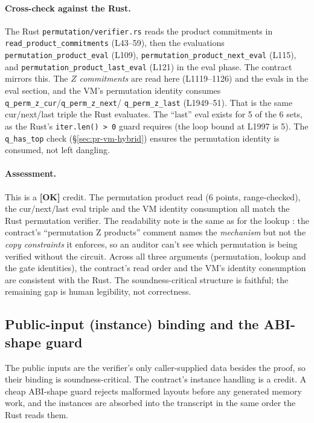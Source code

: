 \paragraph{Cross-check against the Rust.}
The Rust \texttt{permutation/\allowbreak{}verifier.rs} reads the product
commitments in \texttt{read\_\allowbreak{}product\_\allowbreak{}commitments} (L43--59),
then the evaluations \texttt{permutation\_\allowbreak{}product\_\allowbreak{}eval} (L109),
\texttt{permutation\_\allowbreak{}product\_\allowbreak{}next\_\allowbreak{}eval} (L115), and
\texttt{permutation\_\allowbreak{}product\_\allowbreak{}last\_\allowbreak{}eval} (L121) in the eval
phase. The contract mirrors this. The $Z$ \emph{commitments} are
read here (L1119--1126) and the evals in the eval section, and
the VM's permutation identity consumes
\texttt{q\_perm\_z\_cur}/\texttt{q\_perm\_z\_next}/
\texttt{q\_perm\_z\_last} (L1949--51). That is the same
cur/next/last triple the Rust evaluates. The ``last'' eval exists
for 5 of the 6 sets, as the Rust's \texttt{iter.len() > 0} guard
requires (the loop bound at L1997 is 5). The
\texttt{q\_has\_top} check (\S\ref{sec:pr-vm-hybrid}) ensures
the permutation identity is consumed, not left dangling.

\paragraph{Assessment.} This is a
\textcolor{tracegreen}{\textbf{[OK]}} credit. The permutation
product read (6 points, range-checked), the cur/next/last eval
triple and the VM identity consumption all match the Rust
permutation verifier. The readability note is the same as for the
lookup : the contract's ``permutation Z products''
comment names the \emph{mechanism} but not the \emph{copy
constraints} it enforces, so an auditor can't see which
permutation is being verified without the circuit. Across all
three arguments (permutation, lookup and the gate identities), the
contract's read order and the VM's identity consumption are
consistent with the Rust. The soundness-critical structure is
faithful; the remaining gap is human legibility, not correctness.

\subsection{Public-input (instance) binding and the ABI-shape guard}
\label{sec:pr-instance-binding}

The public inputs are the verifier's only caller-supplied data
besides the proof, so their binding is soundness-critical. The
contract's instance handling is a credit. A cheap ABI-shape guard
rejects malformed layouts before any generated memory work, and
the instances are absorbed into the transcript in the same order
the Rust reads them.

